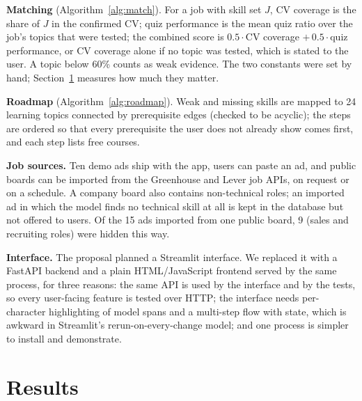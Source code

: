 \documentclass[runningheads]{llncs}
\begin{document}
\textbf{Matching} (Algorithm~\ref{alg:match}). For a job with skill set $J$, CV coverage is the share of
$J$ in the confirmed CV; quiz performance is the mean quiz ratio over the job's topics that were tested;
the combined score is $0.5\cdot$CV coverage $+\,0.5\cdot$quiz performance, or CV coverage alone if no
topic was tested, which is stated to the user. A topic below 60\% counts as weak evidence. The two
constants were set by hand; Section~\ref{sec:results} measures how much they matter.

\textbf{Roadmap} (Algorithm~\ref{alg:roadmap}). Weak and missing skills are mapped to 24 learning
topics connected by prerequisite edges (checked to be acyclic); the steps are ordered so that every
prerequisite the user does not already show comes first, and each step lists free courses.

\textbf{Job sources.} Ten demo ads ship with the app, users can paste an ad, and public boards can be
imported from the Greenhouse and Lever job APIs, on request or on a schedule. A company board also
contains non-technical roles; an imported ad in which the model finds no technical skill at all is kept
in the database but not offered to users. Of the 15 ads imported from one public board, 9 (sales and
recruiting roles) were hidden this way.

\textbf{Interface.} The proposal planned a Streamlit interface. We replaced it with a FastAPI backend
and a plain HTML/JavaScript frontend served by the same process, for three reasons: the same API is used
by the interface and by the tests, so every user-facing feature is tested over HTTP; the interface needs
per-character highlighting of model spans and a multi-step flow with state, which is awkward in
Streamlit's rerun-on-every-change model; and one process is simpler to install and demonstrate.



\section{Results}\label{sec:results}

\begin{table}[t]
\centering
\caption{Entity-level precision, recall and F1 on the SkillSpan test split (3,569 sentences).}
\label{tab:scores}
\resizebox{\textwidth}{!}{}
\end{table}
\end{document}
